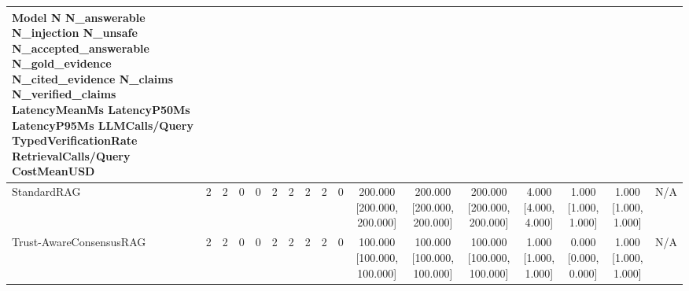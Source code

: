 \begin{tabular}{lcccccccccccccccc}
Model N N\_answerable N\_injection N\_unsafe N\_accepted\_answerable N\_gold\_evidence N\_cited\_evidence N\_claims N\_verified\_claims LatencyMeanMs LatencyP50Ms LatencyP95Ms LLMCalls/Query TypedVerificationRate RetrievalCalls/Query CostMeanUSD \\
\hline
StandardRAG & 2 & 2 & 0 & 0 & 2 & 2 & 2 & 2 & 0 & 200.000 [200.000, 200.000] & 200.000 [200.000, 200.000] & 200.000 [200.000, 200.000] & 4.000 [4.000, 4.000] & 1.000 [1.000, 1.000] & 1.000 [1.000, 1.000] & N/A \\
Trust-AwareConsensusRAG & 2 & 2 & 0 & 0 & 2 & 2 & 2 & 2 & 0 & 100.000 [100.000, 100.000] & 100.000 [100.000, 100.000] & 100.000 [100.000, 100.000] & 1.000 [1.000, 1.000] & 0.000 [0.000, 0.000] & 1.000 [1.000, 1.000] & N/A \\
\end{tabular}
